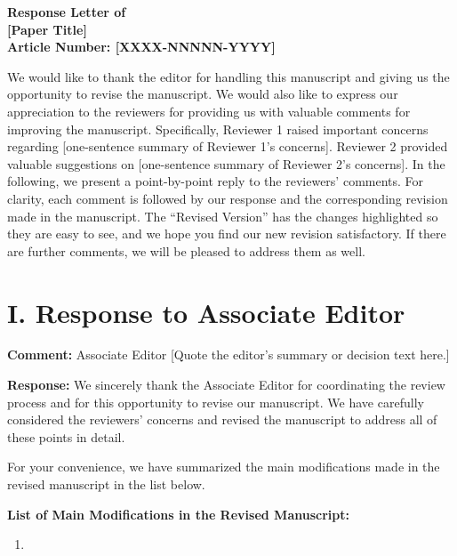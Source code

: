 \documentclass[11pt]{article}
\newenvironment{commentblock}[1][Comment]{%
  \par\noindent\textbf{#1:} %
}{\par}
\begin{document}
\begin{center}
    \Large\bfseries
    Response Letter of \\
    \vspace{0.4cm}
    \large
    [Paper Title] \\
    \vspace{0.4cm}
    Article Number: [XXXX-NNNNN-YYYY]
\end{center}

\vspace{0.6cm}

We would like to thank the editor for handling this manuscript and giving us the opportunity to revise the manuscript. We would also like to express our appreciation to the reviewers for providing us with valuable comments for improving the manuscript. Specifically, Reviewer 1 raised important concerns regarding [one-sentence summary of Reviewer 1's concerns]. Reviewer 2 provided valuable suggestions on [one-sentence summary of Reviewer 2's concerns]. In the following, we present a point-by-point reply to the reviewers' comments. For clarity, each comment is followed by our response and the corresponding revision made in the manuscript. The ``Revised Version'' has the changes highlighted so they are easy to see, and we hope you find our new revision satisfactory. If there are further comments, we will be pleased to address them as well.


\section*{I. Response to Associate Editor}

\begin{commentblock}{Associate Editor}
[Quote the editor's summary or decision text here.]
\end{commentblock}

\begin{responseblock}
\textbf{Response:} We sincerely thank the Associate Editor for coordinating the review process and for this opportunity to revise our manuscript. We have carefully considered the reviewers' concerns and revised the manuscript to address all of these points in detail.

For your convenience, we have summarized the main modifications made in the revised manuscript in the list below.

\noindent\textbf{List of Main Modifications in the Revised Manuscript:}
\begin{enumerate}[label=Modification \arabic*:, leftmargin=*]
    \item [One line per major change: what was added or revised, and in which section.]
\end{enumerate}
\end{responseblock}
\end{document}

